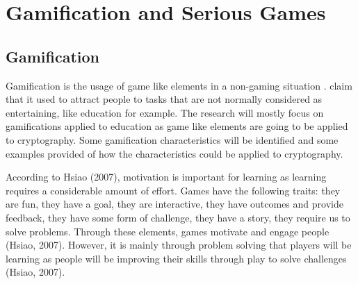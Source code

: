 \documentclass{l4proj}
\begin{document}
\section{Gamification and Serious Games}

\subsection{Gamification}
Gamification is the usage of game like elements in a non-gaming situation \citep{aparicio_analysis_2012}.
\citet{aparicio_analysis_2012} claim that it used to attract people to tasks that are not normally considered as entertaining, like education for example.
The research will mostly focus on gamifications applied to education as game like elements are going to be applied to cryptography.
Some gamification characteristics will be identified and some examples provided of how the characteristics could be applied to cryptography.

According to Hsiao (2007), motivation is important for learning as learning requires a considerable amount of effort. 
Games have the following traits: they are fun, they have a goal, they are interactive, they have outcomes and provide feedback, they have some form of challenge, 
they have a story, they require us to solve problems. Through these elements, games motivate and engage people (Hsiao, 2007). 
However, it is mainly through problem solving that players will be learning as people will be improving their skills through play to solve challenges (Hsiao, 2007).
\end{document}
